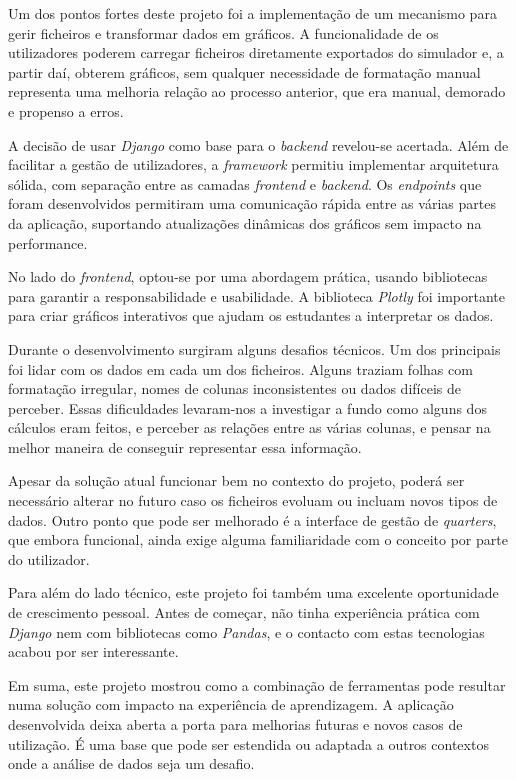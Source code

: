 Um dos pontos fortes deste projeto foi a implementação de um mecanismo para gerir ficheiros e transformar dados em gráficos. A funcionalidade de os utilizadores poderem carregar ficheiros diretamente exportados do simulador e, a partir daí, obterem gráficos, sem qualquer necessidade de formatação manual representa uma melhoria relação ao processo anterior, que era manual, demorado e propenso a erros. 

A decisão de usar \textit{Django} como base para o \textit{backend} revelou-se acertada. Além de facilitar a gestão de utilizadores, a \textit{framework} permitiu implementar arquitetura sólida, com separação entre as camadas \textit{frontend} e \textit{backend}. Os \textit{endpoints} que foram desenvolvidos permitiram uma comunicação rápida entre as várias partes da aplicação, suportando atualizações dinâmicas dos gráficos sem impacto na performance.

No lado do \textit{frontend}, optou-se por uma abordagem prática, usando bibliotecas para garantir a responsabilidade e usabilidade. A biblioteca \textit{Plotly} foi importante para criar gráficos interativos que ajudam os estudantes a interpretar os dados.

Durante o desenvolvimento surgiram alguns desafios técnicos. Um dos principais foi lidar com os dados em cada um dos ficheiros. Alguns traziam folhas com formatação irregular, nomes de colunas inconsistentes ou dados difíceis de perceber. Essas dificuldades levaram-nos a investigar a fundo como alguns dos cálculos eram feitos, e perceber as relações entre as várias colunas, e pensar na melhor maneira de conseguir representar essa informação.

Apesar da solução atual funcionar bem no contexto do projeto, poderá ser necessário alterar no futuro caso os ficheiros evoluam ou incluam novos tipos de dados. Outro ponto que pode ser melhorado é a interface de gestão de \textit{quarters}, que embora funcional, ainda exige alguma familiaridade com o conceito por parte do utilizador.

Para além do lado técnico, este projeto foi também uma excelente oportunidade de crescimento pessoal. Antes de começar, não tinha experiência prática com \textit{Django} nem com bibliotecas como \textit{Pandas}, e o contacto com estas tecnologias acabou por ser interessante. 

Em suma, este projeto mostrou como a combinação de ferramentas pode resultar numa solução com impacto na experiência de aprendizagem. A aplicação desenvolvida deixa aberta a porta para melhorias futuras e novos casos de utilização. É uma base que pode ser estendida ou adaptada a outros contextos onde a análise de dados seja um desafio.

